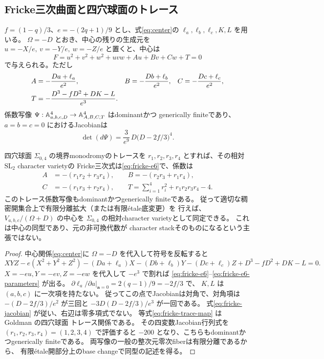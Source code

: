 \subsection{Fricke三次曲面と四穴球面のトレース}
\begin{theorem}
\label{thm:fricke-trace-dominant}
$f=(1-q)/3$、$e=-(2q+1)/9$ とし、式\eqref{eq:center}の
$\ell_a,\ell_b,\ell_c,K,L$ を用いる。
$\Omega=-D$ とおき、中心の残りの生成元を
$u=-X/e,\ v=-Y/e,\ w=-Z/e$ と置くと、中心は
\begin{equation}\label{eq:fricke-e6}
 F=u^2+v^2+w^2+uvw+A u+B v+C w+T=0
\end{equation}
で与えられる。ただし
\begin{align}\label{eq:fricke-e6-parameters}
 A&=-\frac{Da+\ell_a}{e^2},&
 B&=-\frac{Db+\ell_b}{e^2},&
 C&=-\frac{Dc+\ell_c}{e^2},\\
 T&=-\frac{D^3-fD^2+DK-L}{e^3}.\notag
\end{align}
係数写像 $\Psi:\AA^4_{a,b,c,D}\to\AA^4_{A,B,C,T}$ はdominantかつ
generically finiteであり、$a=b=c=0$ におけるJacobianは
\begin{equation}\label{eq:fricke-jacobian}
 \det(d\Psi)=\frac{3}{e^9}\,D\bigl(D-2f/3\bigr)^4.
\end{equation}

四穴球面 $\Sigma_{0,4}$ の境界monodromyのトレースを
$r_1,r_2,r_3,r_4$ とすれば、その相対 $\mathrm{SL}_2$ character varietyの
Fricke三次式は\eqref{eq:fricke-e6}で、係数は
\begin{equation}\label{eq:fricke-trace-map}
\begin{split}
 A&=-(r_1r_2+r_3r_4),\qquad
 B=-(r_2r_3+r_1r_4),\\
 C&=-(r_1r_3+r_2r_4),\qquad
 T=\sum_{i=1}^{4}r_i^2+r_1r_2r_3r_4-4.
\end{split}
\end{equation}
このトレース係数写像もdominantかつgenerically finiteである。
従って適切な稠密開集合上で有限分離拡大（または有限\'{e}tale底変更）を
行えば、$V_{a,b,c}/(\Omega+D)$ の中心を
$\Sigma_{0,4}$ の相対character varietyとして同定できる。
これは中心の同型であり、元の非可換代数が
character stackそのものになるという主張ではない。
\end{theorem}
\begin{proof}
中心関係\eqref{eq:center}に $\Omega=-D$ を代入して符号を反転すると
\[
 XYZ-e(X^2+Y^2+Z^2)
 -(Da+\ell_a)X-(Db+\ell_b)Y-(Dc+\ell_c)Z
 +D^3-fD^2+DK-L=0.
\]
$X=-eu,Y=-ev,Z=-ew$ を代入して $-e^3$ で割れば
\eqref{eq:fricke-e6}--\eqref{eq:fricke-e6-parameters} が出る。
$\partial\ell_a/\partial a|_{\mathbf a=0}=2(q-1)/9=-2f/3$ で、
$K,L$ は $(a,b,c)$ に一次項を持たない。
従ってこの点でJacobianは対角で、対角項は
$-(D-2f/3)/e^2$ が三回と $-3D(D-2f/3)/e^3$ が一回である。
式\eqref{eq:fricke-jacobian} が従い、右辺は零多項式でない。
等式\eqref{eq:fricke-trace-map} は
Goldman \cite[\S5.2.1, equation (5.2.1.2)]{GoldmanTrace} の四穴球面
トレース関係である。
その四変数Jacobian行列式を $(r_1,r_2,r_3,r_4)=(1,2,3,4)$ で評価すると
$-200$ となり、こちらもdominantかつgenerically finiteである。
両写像の一般の整次元零次fiberは有限分離であるから、
有限\'{e}tale開部分上のbase changeで同型の記述を得る。
\end{proof}

